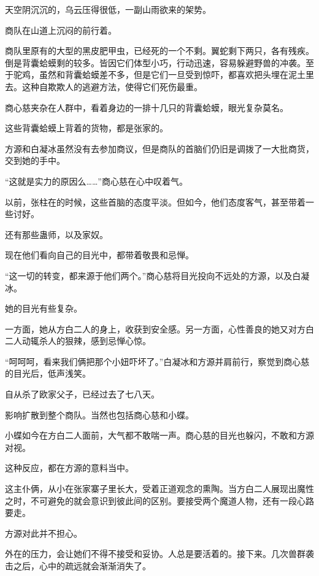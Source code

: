 
\begin{this_body}

天空阴沉沉的，乌云压得很低，一副山雨欲来的架势。

商队在山道上沉闷的前行着。

商队里原有的大型的黑皮肥甲虫，已经死的一个不剩。翼蛇剩下两只，各有残疾。倒是背囊蛤蟆剩的较多。皆因它们体型小巧，行动迅速，容易躲避野兽的冲袭。至于驼鸡，虽然和背囊蛤蟆差不多，但是它们一旦受到惊吓，都喜欢把头埋在泥土里去。这种自欺欺人的逃避方法，使得它们死伤最重。

商心慈夹杂在人群中，看着身边的一排十几只的背囊蛤蟆，眼光复杂莫名。

这些背囊蛤蟆上背着的货物，都是张家的。

方源和白凝冰虽然没有去参加商议，但是商队的首脑们仍旧是调拨了一大批商货，交到她的手中。

“这就是实力的原因么……”商心慈在心中叹着气。

以前，张柱在的时候，这些首脑的态度平淡。但如今，他们态度客气，甚至带着一些讨好。

还有那些蛊师，以及家奴。

现在他们看向自己的目光中，都带着敬畏和忌惮。

“这一切的转变，都来源于他们两个。”商心慈将目光投向不远处的方源，以及白凝冰。

她的目光有些复杂。

一方面，她从方白二人的身上，收获到安全感。另一方面，心性善良的她又对方白二人动辄杀人的狠辣，感到忌惮心惊。

“呵呵呵，看来我们俩把那个小妞吓坏了。”白凝冰和方源并肩前行，察觉到商心慈的目光后，低声浅笑。

自从杀了欧家父子，已经过去了七八天。

影响扩散到整个商队。当然也包括商心慈和小蝶。

小蝶如今在方白二人面前，大气都不敢喘一声。商心慈的目光也躲闪，不敢和方源对视。

这种反应，都在方源的意料当中。

这主仆俩，从小在张家寨子里长大，受着正道观念的熏陶。当方白二人展现出魔性之时，不可避免的就会意识到彼此间的区别。要接受两个魔道人物，还有一段心路要走。

方源对此并不担心。

外在的压力，会让她们不得不接受和妥协。人总是要活着的。接下来。几次兽群袭击之后，心中的疏远就会渐渐消失了。


\end{this_body}
